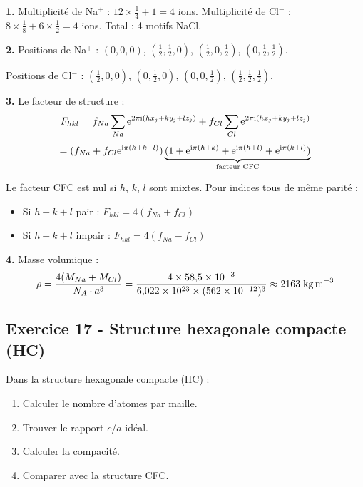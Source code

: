\documentclass[12pt,a4paper]{article}
\begin{document}
\begin{boitecorrige}
\textbf{1.} Multiplicité de Na$^+$ : $12\times\frac{1}{4} + 1 = 4$ ions. Multiplicité de Cl$^-$ : $8\times\frac{1}{8} + 6\times\frac{1}{2} = 4$ ions. Total : 4 motifs NaCl.

\textbf{2.} Positions de Na$^+$ : $(0,0,0)$, $(\frac{1}{2},\frac{1}{2},0)$, $(\frac{1}{2},0,\frac{1}{2})$, $(0,\frac{1}{2},\frac{1}{2})$.

Positions de Cl$^-$ : $(\frac{1}{2},0,0)$, $(0,\frac{1}{2},0)$, $(0,0,\frac{1}{2})$, $(\frac{1}{2},\frac{1}{2},\frac{1}{2})$.

\textbf{3.} Le facteur de structure :
\[
F_{hkl} = f_{Na}\sum_{Na}\mathrm{e}^{2\pi\mathrm{i}(hx_j+ky_j+lz_j)} + f_{Cl}\sum_{Cl}\mathrm{e}^{2\pi\mathrm{i}(hx_j+ky_j+lz_j)}
\]
\[
= (f_{Na} + f_{Cl}\mathrm{e}^{\mathrm{i}\pi(h+k+l)})\underbrace{(1+\mathrm{e}^{\mathrm{i}\pi(h+k)}+\mathrm{e}^{\mathrm{i}\pi(h+l)}+\mathrm{e}^{\mathrm{i}\pi(k+l)})}_{\text{facteur CFC}}
\]

Le facteur CFC est nul si $h$, $k$, $l$ sont mixtes. Pour indices tous de même parité :
\begin{itemize}[nosep]
  \item Si $h+k+l$ pair : $F_{hkl} = 4(f_{Na} + f_{Cl})$
  \item Si $h+k+l$ impair : $F_{hkl} = 4(f_{Na} - f_{Cl})$
\end{itemize}

\textbf{4.} Masse volumique :
\[
\rho = \frac{4(M_{Na}+M_{Cl})}{N_A\cdot a^3} = \frac{4\times58{,}5\times10^{-3}}{6{,}022\times10^{23}\times(562\times10^{-12})^3} \approx 2163\;\text{kg\,m}^{-3}
\]
\end{boitecorrige}

\subsection*{Exercice 17 - Structure hexagonale compacte (HC) \niveau{\moyen}}

\begin{boiteexercice}
Dans la structure hexagonale compacte (HC) :
\begin{enumerate}
  \item Calculer le nombre d'atomes par maille.
  \item Trouver le rapport $c/a$ idéal.
  \item Calculer la compacité.
  \item Comparer avec la structure CFC.
\end{enumerate}
\end{boiteexercice}
\end{document}
